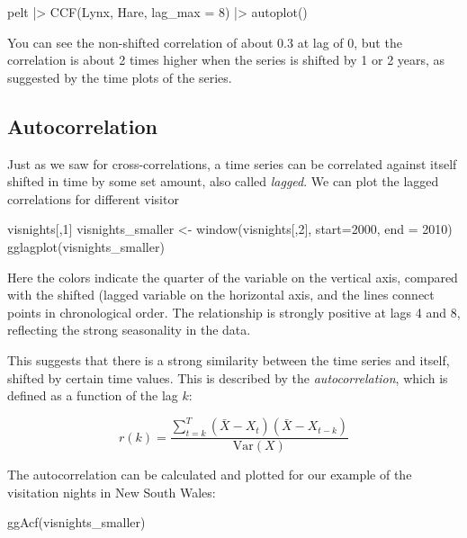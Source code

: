 \documentclass[
  letterpaper,
  DIV=11,
  numbers=noendperiod]{scrreprt}
\newenvironment{Shaded}{\begin{snugshade}}{\end{snugshade}}
\newcommand{\NormalTok}[1]{\textcolor[rgb]{0.00,0.23,0.31}{#1}}
\begin{document}
\begin{Shaded}
\begin{Highlighting}[]
\NormalTok{pelt |\textgreater{}}
\NormalTok{  CCF(Lynx, Hare, lag\_max = 8) |\textgreater{}}
\NormalTok{  autoplot()}
\end{Highlighting}
\end{Shaded}

You can see the non-shifted correlation of about 0.3 at lag of 0, but
the correlation is about 2 times higher when the series is shifted by 1
or 2 years, as suggested by the time plots of the series.

\subsection{Autocorrelation}\label{autocorrelation}

Just as we saw for cross-correlations, a time series can be correlated
against itself shifted in time by some set amount, also called
\emph{lagged}. We can plot the lagged correlations for different visitor

\begin{Shaded}
\begin{Highlighting}[]
\NormalTok{visnights[,1]}
\NormalTok{visnights\_smaller \textless{}{-} window(visnights[,2], start=2000, end = 2010)}
\NormalTok{gglagplot(visnights\_smaller) }
\end{Highlighting}
\end{Shaded}

Here the colors indicate the quarter of the variable on the vertical
axis, compared with the shifted (lagged variable on the horizontal axis,
and the lines connect points in chronological order. The relationship is
strongly positive at lags 4 and 8, reflecting the strong seasonality in
the data.

This suggests that there is a strong similarity between the time series
and itself, shifted by certain time values. This is described by the
\emph{autocorrelation}, which is defined as a function of the lag \(k\):

\[
r(k) = \frac{\sum_{t=k}^T (\bar X - X_t)(\bar X - X_{t-k})}{\text{Var}(X)}
\]

The autocorrelation can be calculated and plotted for our example of the
visitation nights in New South Wales:

\begin{Shaded}
\begin{Highlighting}[]
\NormalTok{ggAcf(visnights\_smaller)}
\end{Highlighting}
\end{Shaded}
\end{document}
